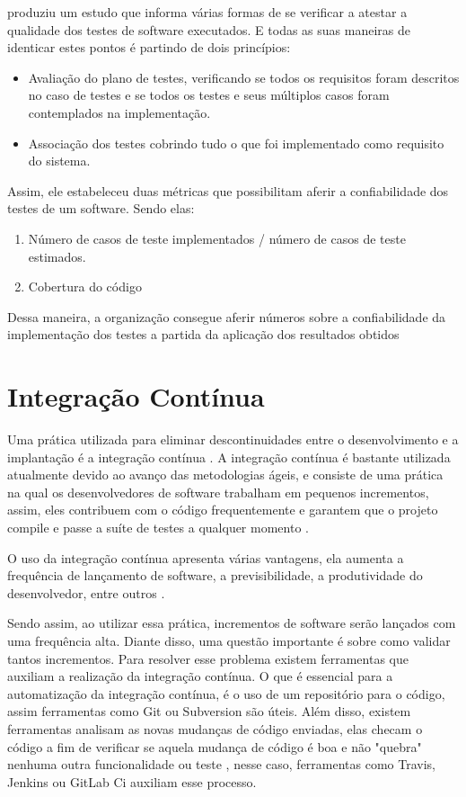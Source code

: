 \cite{e07} produziu um estudo que informa várias formas de se verificar a atestar
a qualidade dos testes de software executados. E todas as suas maneiras de identicar
estes pontos é partindo de dois princípios:

\begin{itemize}
\item Avaliação do plano de testes, verificando se todos os requisitos foram
descritos no caso de testes e se todos os testes e seus múltiplos casos foram
contemplados na implementação.
\item Associação dos testes cobrindo tudo o que foi implementado como requisito
do sistema.
\end{itemize}

Assim, ele estabeleceu duas métricas que possibilitam aferir a confiabilidade
dos testes de um software. Sendo elas:

\begin{enumerate}
\item Número de casos de teste implementados / número de casos de teste estimados.
\item Cobertura do código
\end{enumerate}

Dessa maneira, a organização consegue aferir números sobre a confiabilidade
da implementação dos testes a partida da aplicação dos resultados obtidos  \cite{e07}

\section{Integração Contínua}
Uma prática utilizada para eliminar descontinuidades entre o desenvolvimento e a implantação é a integração contínua \cite{roadmap}. A integração contínua é bastante utilizada atualmente devido ao avanço das metodologias ágeis, e consiste de uma prática na qual os desenvolvedores de software trabalham em pequenos incrementos, assim, eles contribuem com o código frequentemente e garantem que o projeto compile e passe a suíte de testes a qualquer momento \cite{opensource}.

O uso da integração contínua apresenta várias vantagens, ela aumenta a frequência de lançamento de software, a previsibilidade, a produtividade do desenvolvedor, entre outros \cite{practice}.

Sendo assim, ao utilizar essa prática, incrementos de software serão lançados com uma frequência alta. Diante disso, uma questão importante é sobre como validar tantos incrementos. Para resolver esse problema existem ferramentas que auxiliam a realização da integração contínua. O que é essencial para a automatização da integração contínua, é o uso de um repositório para o código, assim ferramentas como Git ou Subversion são úteis. Além disso, existem ferramentas analisam as novas mudanças de código enviadas, elas checam o código a fim de verificar se aquela mudança de código é boa e não "quebra"  nenhuma outra funcionalidade ou teste \cite{meyer}, nesse caso, ferramentas como Travis, Jenkins ou GitLab Ci auxiliam esse processo.

